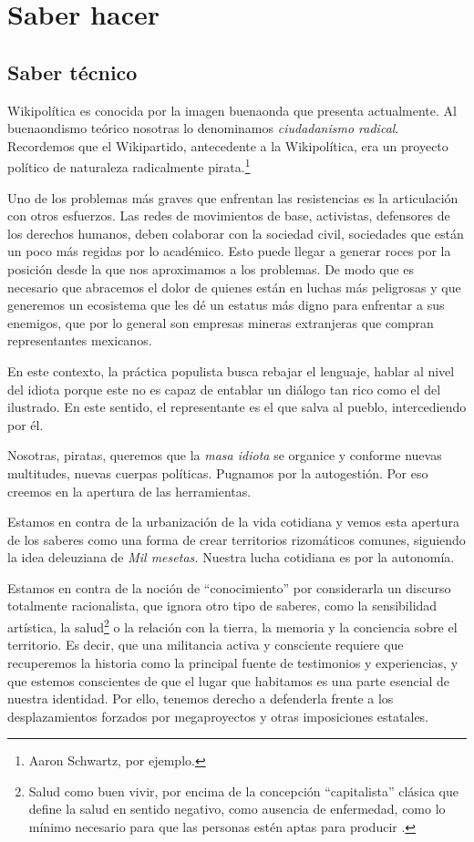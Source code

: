 \hypertarget{saber-hacer}{%
\section{Saber hacer}}\label{saber-hacer}

\hypertarget{saber-tuxe9cnico}{%
\subsection{Saber técnico}\label{saber-tuxe9cnico}}

Wikipolítica es conocida por la imagen buenaonda que presenta
actualmente. Al buenaondismo teórico nosotras lo denominamos
\emph{ciudadanismo radical}. Recordemos que el Wikipartido, antecedente
a la Wikipolítica, era un proyecto político de naturaleza radicalmente
pirata.\footnote{Aaron Schwartz, por ejemplo.}

Uno de los problemas más graves que enfrentan las resistencias es la
articulación con otros esfuerzos. Las redes de movimientos de base,
activistas, defensores de los derechos humanos, deben colaborar con la
sociedad civil, sociedades que están un poco más regidas por lo
académico. Esto puede llegar a generar roces por la posición desde la
que nos aproximamos a los problemas. De modo que es necesario que
abracemos el dolor de quienes están en luchas más peligrosas y que
generemos un ecosistema que les dé un estatus más digno para enfrentar a
sus enemigos, que por lo general son empresas mineras extranjeras que
compran representantes mexicanos.

En este contexto, la práctica populista busca rebajar el lenguaje,
hablar al nivel del idiota porque este no es capaz de entablar un
diálogo tan rico como el del ilustrado. En este sentido, el
representante es el que salva al pueblo, intercediendo por él.

Nosotras, piratas, queremos que la \emph{masa idiota} se organice y
conforme nuevas multitudes, nuevas cuerpas políticas. Pugnamos por la
autogestión. Por eso creemos en la apertura de las herramientas.

Estamos en contra de la urbanización de la vida cotidiana y vemos esta
apertura de los saberes como una forma de crear territorios rizomáticos
comunes, siguiendo la idea deleuziana de \emph{Mil mesetas.} Nuestra
lucha cotidiana es por la autonomía.

Estamos en contra de la noción de ``conocimiento'' por considerarla un
discurso totalmente racionalista, que ignora otro tipo de saberes, como
la sensibilidad artística, la salud\footnote{Salud como buen vivir, por
  encima de la concepción ``capitalista'' clásica que define la salud en
  sentido negativo, como ausencia de enfermedad, como lo mínimo
  necesario para que las personas estén aptas para
  producir \cite{Balch2013}.} o la relación con la
tierra, la memoria y la conciencia sobre el territorio. Es decir, que
una militancia activa y consciente requiere que recuperemos la historia
como la principal fuente de testimonios y experiencias, y que estemos
conscientes de que el lugar que habitamos es una parte esencial de
nuestra identidad. Por ello, tenemos derecho a defenderla frente a los
desplazamientos forzados por megaproyectos y otras imposiciones
estatales.

